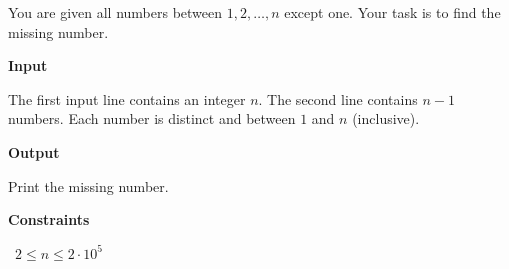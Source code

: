 You are given all numbers between $1,2,\ldots,n$ except one. Your task is to find the missing number.

\vspace{0.3cm}\noindent\textbf{Input}

The first input line contains an integer $n$.
The second line contains $n-1$ numbers. Each number is distinct and between $1$ and $n$ (inclusive).

\vspace{0.3cm}\noindent\textbf{Output}

Print the missing number.

\vspace{0.3cm}\noindent\textbf{Constraints}

\textbullet\ $2 \le n \le 2 \cdot 10^5$